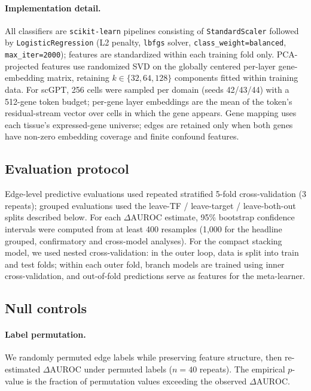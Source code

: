 \documentclass[11pt]{article}
\newcommand{\DAURC}{\Delta\mathrm{AUROC}}
\begin{document}
\paragraph{Implementation detail.}
All classifiers are \texttt{scikit-learn} pipelines consisting of \texttt{StandardScaler} followed by \texttt{LogisticRegression} (L2 penalty, \texttt{lbfgs} solver, \texttt{class\_weight=balanced}, \texttt{max\_iter=2000}); features are standardized within each training fold only.
PCA-projected features use randomized SVD on the globally centered per-layer gene-embedding matrix, retaining $k \in \{32, 64, 128\}$ components fitted within training data.
For scGPT, 256 cells were sampled per domain (seeds 42/43/44) with a 512-gene token budget; per-gene layer embeddings are the mean of the token's residual-stream vector over cells in which the gene appears.
Gene mapping uses each tissue's expressed-gene universe; edges are retained only when both genes have non-zero embedding coverage and finite confound features.

\subsection*{Evaluation protocol}

Edge-level predictive evaluations used repeated stratified 5-fold cross-validation (3 repeats); grouped evaluations used the leave-TF / leave-target / leave-both-out splits described below.
For each $\DAURC$ estimate, 95\% bootstrap confidence intervals were computed from at least 400 resamples (1,000 for the headline grouped, confirmatory and cross-model analyses).
For the compact stacking model, we used nested cross-validation: in the outer loop, data is split into train and test folds; within each outer fold, branch models are trained using inner cross-validation, and out-of-fold predictions serve as features for the meta-learner.

\subsection*{Null controls}

\paragraph{Label permutation.}
We randomly permuted edge labels while preserving feature structure, then re-estimated $\DAURC$ under permuted labels ($n = 40$ repeats).
The empirical $p$-value is the fraction of permutation values exceeding the observed $\DAURC$.
\end{document}
